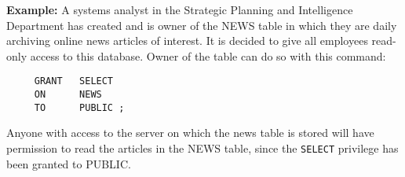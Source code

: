 {\bf Example:}
A systems analyst in the Strategic Planning and Intelligence
Department has created and is owner of the NEWS table in which they
are daily archiving online news articles of interest.  It is decided
to give all employees read-only access to this database.  Owner of the
table can do so with this command:

\begin{verbatim}
     GRANT   SELECT
     ON      NEWS
     TO      PUBLIC ;
\end{verbatim}

Anyone with access to the server on which the news table is stored
will have permission to read the articles in the NEWS table, since the
\verb`SELECT` privilege has been granted to PUBLIC.

%
%
%
%
%
%
%
%
